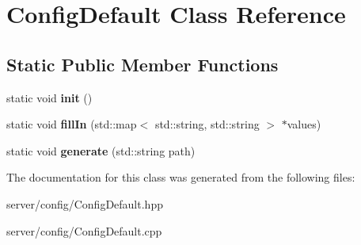 \hypertarget{class_config_default}{\section{Config\-Default Class Reference}
\label{class_config_default}
}
\subsection*{Static Public Member Functions}
\begin{DoxyCompactItemize}
\item 
\hypertarget{class_config_default_ad5ca1ccfba4aa2b33e4ecf9004602366}{static void {\bfseries init} ()}\label{class_config_default_ad5ca1ccfba4aa2b33e4ecf9004602366}

\item 
\hypertarget{class_config_default_a2ca3b26d929d8983e9783bc43cf8441c}{static void {\bfseries fill\-In} (std\-::map$<$ std\-::string, std\-::string $>$ $\ast$values)}\label{class_config_default_a2ca3b26d929d8983e9783bc43cf8441c}

\item 
\hypertarget{class_config_default_a57727b2fbe9972c9f0caae8d1dc975f1}{static void {\bfseries generate} (std\-::string path)}\label{class_config_default_a57727b2fbe9972c9f0caae8d1dc975f1}

\end{DoxyCompactItemize}


The documentation for this class was generated from the following files\-:\begin{DoxyCompactItemize}
\item 
server/config/Config\-Default.\-hpp\item 
server/config/Config\-Default.\-cpp\end{DoxyCompactItemize}
